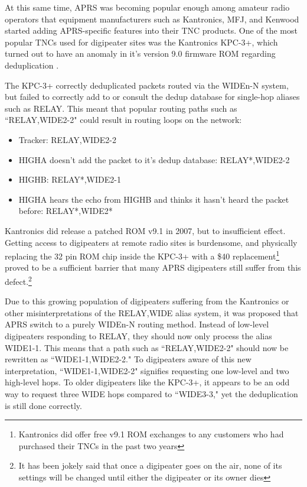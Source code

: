 At this same time, APRS was becoming popular enough among amateur radio operators that
equipment manufacturers such as Kantronics, MFJ, and Kenwood started adding APRS-specific features
into their TNC products.
One of the most popular TNCs used for digipeater sites was the Kantronics KPC-3+,
which turned out to have an anomaly in it's 
version 9.0 firmware ROM regarding deduplication \cite{kpc3bugbulletin}.

The KPC-3+ correctly deduplicated packets routed via the WIDEn-N system,
but failed to correctly add to or consult the dedup database for single-hop
aliases such as RELAY.
This meant that popular routing paths such as ``RELAY,WIDE2-2" could result in
routing loops on the network:

\begin{itemize}
	\item Tracker: RELAY,WIDE2-2
	\item HIGHA doesn't add the packet to it's dedup database: RELAY*,WIDE2-2 
	\item HIGHB: RELAY*,WIDE2-1
	\item HIGHA hears the echo from HIGHB and thinks it hasn't heard the packet before: RELAY*,WIDE2*
\end{itemize}

Kantronics did release a patched ROM v9.1 in 2007, but to insufficient effect.
Getting access to digipeaters at remote radio sites is burdensome,
and physically replacing the 32 pin ROM chip inside the KPC-3+ 
with a \$40 replacement\footnote{Kantronics did offer free v9.1 ROM exchanges to 
any customers who had purchased their TNCs in the past two years} 
proved to be a sufficient barrier that many APRS digipeaters still
suffer from this defect.\footnote{It has been jokely said that once a digipeater
	goes on the air, none of its settings will be changed until either the digipeater
or its owner dies}

Due to this growing population of digipeaters suffering from the Kantronics or other
misinterpretations of the RELAY,WIDE alias system, 
it was proposed that APRS switch to a purely WIDEn-N routing method. 
Instead of low-level digipeaters responding to RELAY,
they should now only process the alias WIDE1-1.
This means that a path such as ``RELAY,WIDE2-2" should now be rewritten as
``WIDE1-1,WIDE2-2." 
To digipeaters aware of this new interpretation, ``WIDE1-1,WIDE2-2" signifies 
requesting one low-level and two high-level hops.
To older digipeaters like the KPC-3+, it appears to be an odd way to request
three WIDE hops compared to ``WIDE3-3," 
yet the deduplication is still done correctly.

